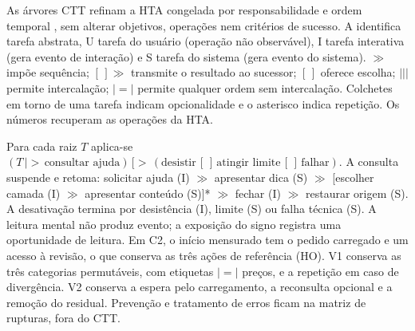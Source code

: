 As árvores CTT refinam a HTA congelada \cite[pp.~3, 5, 8--9]{hts} por responsabilidade e ordem temporal \cite[cap.~4, pp.~39--66]{paterno}, sem alterar objetivos, operações nem critérios de sucesso. A identifica tarefa abstrata, U tarefa do usuário (operação não observável), I tarefa interativa (gera evento de interação) e S tarefa do sistema (gera evento do sistema). $\gg$ impõe sequência; $[\,]\gg$ transmite o resultado ao sucessor; $[\,]$ oferece escolha; $|||$ permite intercalação; $|=|$ permite qualquer ordem sem intercalação. Colchetes em torno de uma tarefa indicam opcionalidade e o asterisco indica repetição. Os números recuperam as operações da HTA.
\par Para cada raiz $T$ aplica-se $(T\,|>\,\text{consultar ajuda})\,[>\,(\text{desistir}\,[\,]\,\text{atingir limite}\,[\,]\,\text{falhar})$. A consulta suspende e retoma: solicitar ajuda (I) $\gg$ apresentar dica (S) $\gg$ [escolher camada (I) $\gg$ apresentar conteúdo (S)]* $\gg$ fechar (I) $\gg$ restaurar origem (S). A desativação termina por desistência (I), limite (S) ou falha técnica (S). A leitura mental não produz evento; a exposição do signo registra uma oportunidade de leitura. Em C2, o início mensurado tem o pedido carregado e um acesso à revisão, o que conserva as três ações de referência (HO). V1 conserva as três categorias permutáveis, com etiquetas $|=|$ preços, e a repetição em caso de divergência. V2 conserva a espera pelo carregamento, a reconsulta opcional e a remoção do residual. Prevenção e tratamento de erros ficam na matriz de rupturas, fora do CTT.
